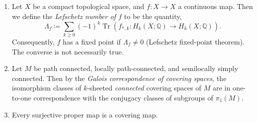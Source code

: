 \documentclass{article}
\begin{document}
\begin{enumerate}[start=18]
		\item Let $X$ be a compact topological space, and $f: X \to X$ a continuous map. Then we define the \textit{Lefschetz number of $f$} to be the quantity, 
		\begin{equation*}
			\Lambda_{f} \coloneqq \sum_{k \geq 0}(-1)^{k}\operatorname{Tr}\left(f_{\ast,k}: H_{k}(X; \mathbb{Q}) \to H_{k}(X; \mathbb{Q})\right). 
		\end{equation*}
		Consequently, $f$ has a fixed point if $\Lambda_{f} \neq 0$ (Lefschetz fixed-point theorem). The converse is not necessarily true. 
		\item Let $M$ be path connected, locally path-connected, and semilocally simply connected. Then by the \textit{Galois correspondence of covering spaces}, the isomorphism classes of $k$-sheeted \textit{connected} covering spaces of $M$ are in one-to-one correspondence with the conjugacy classes of subgroups of $\pi_{1}(M)$. 
		\item Every surjective proper map is a covering map. 
	\end{enumerate}
\end{document}
